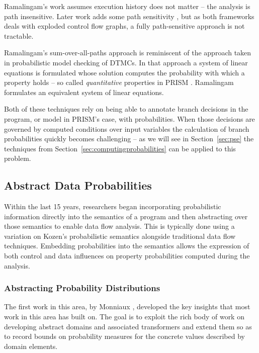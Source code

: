Ramalingam's work assumes execution history does not matter --  
the analysis is path insensitive.
Later work adds some path sensitivity \cite{mehofer2001novel}, 
but as both frameworks deals with exploded control flow graphs, a fully 
path-sensitive approach is not tractable.

Ramalingam's sum-over-all-paths approach is reminiscent of
the approach taken in probabilistic model checking of DTMCs.
In that approach a system of linear equations is formulated
whose solution computes the probability with which a property
holds -- so called \textit{quantitative} properties in 
PRISM \cite{PRISMmarktoberdorf}.   Ramalingam formulates an
equivalent system of linear equations.  

Both of these techniques rely on being able to annotate
branch decisions in the program, or model in PRISM's case, 
with probabilities.  When those decisions are governed by
computed conditions over input variables the calculation of
branch probabilities quickly becomes challenging -- as we will
see in Section~\ref{sec:pse} the techniques from 
Section~\ref{sec:computingprobabilities} can be applied to
this problem.


\subsection{Abstract Data Probabilities}
Within the last 15 years, researchers 
began incorporating probabilistic information directly into
the semantics of a program and then abstracting over 
those semantics \cite{monniaux2000abstract,others}
to enable data flow analysis.
This is typically done using a variation on Kozen's 
probabilistic semantics \cite{kozen1981semantics} 
alongside traditional data flow techniques.
Embedding probabilities into the semantics allows 
the expression of both control and data influences on property
probabilities computed during the analysis.

\subsubsection{Abstracting Probability Distributions}
The first work in this area, by 
Monniaux \cite{monniaux2000abstract,monniaux2001backwards},
developed the key insights that most work in this area has built on. 
The goal is to exploit the rich body of work on developing
abstract domains and associated transformers and extend them
so as to record bounds on probability measures for the concrete values
described by domain elements.

